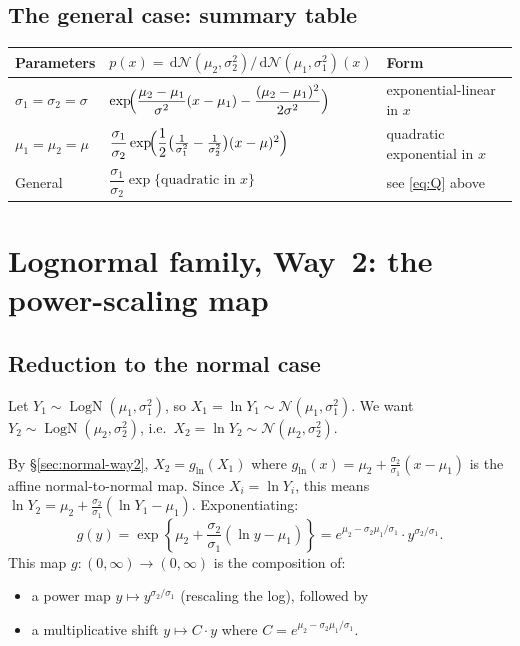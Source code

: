 \documentclass[11pt,a4paper]{article}
\newcommand{\N}{\mathcal{N}}
\newcommand{\LN}{\operatorname{LogN}}
\newcommand{\dif}{\,\mathrm{d}}
\begin{document}
\subsection{The general case: summary table}

\begin{center}
\begin{tabular}{lll}
\toprule
\textbf{Parameters}
  & $p(x)=\dif\N(\mu_2,\sigma_2^2)/\dif\N(\mu_1,\sigma_1^2)(x)$
  & \textbf{Form} \\
\midrule
$\sigma_1=\sigma_2=\sigma$
  & $\exp\!\Bigl(\dfrac{\mu_2-\mu_1}{\sigma^2}(x-\mu_1)
                       -\dfrac{(\mu_2-\mu_1)^2}{2\sigma^2}\Bigr)$
  & exponential-linear in $x$ \\[10pt]
$\mu_1=\mu_2=\mu$
  & $\dfrac{\sigma_1}{\sigma_2}
     \exp\!\Bigl(\dfrac{1}{2}\bigl(\tfrac{1}{\sigma_1^2}-\tfrac{1}{\sigma_2^2}\bigr)(x-\mu)^2\Bigr)$
  & quadratic exponential in $x$ \\[10pt]
General
  & $\dfrac{\sigma_1}{\sigma_2}\exp\{\text{quadratic in }x\}$
  & see \eqref{eq:Q} above \\
\bottomrule
\end{tabular}
\end{center}

\section{Lognormal family, Way~2: the power-scaling map}
\label{sec:logn-way2}

\subsection{Reduction to the normal case}

Let $Y_1\sim\LN(\mu_1,\sigma_1^2)$, so $X_1=\ln Y_1\sim\N(\mu_1,\sigma_1^2)$.
We want $Y_2\sim\LN(\mu_2,\sigma_2^2)$, i.e.\ $X_2=\ln Y_2\sim\N(\mu_2,\sigma_2^2)$.

By \S\ref{sec:normal-way2}, $X_2=g_{\ln}(X_1)$ where
$g_{\ln}(x)=\mu_2+\frac{\sigma_2}{\sigma_1}(x-\mu_1)$ is the affine normal-to-normal map.
Since $X_i=\ln Y_i$, this means $\ln Y_2=\mu_2+\frac{\sigma_2}{\sigma_1}(\ln Y_1-\mu_1)$.
Exponentiating:
\[
  g(y)=\exp\!\left\{\mu_2+\frac{\sigma_2}{\sigma_1}(\ln y-\mu_1)\right\}
       =e^{\mu_2-\sigma_2\mu_1/\sigma_1}\cdot y^{\sigma_2/\sigma_1}.
\]
This map $g:(0,\infty)\to(0,\infty)$ is the composition of:
\begin{itemize}
  \item a power map $y\mapsto y^{\sigma_2/\sigma_1}$ (rescaling the log), followed by
  \item a multiplicative shift $y\mapsto C\cdot y$ where $C=e^{\mu_2-\sigma_2\mu_1/\sigma_1}$.
\end{itemize}
\end{document}
